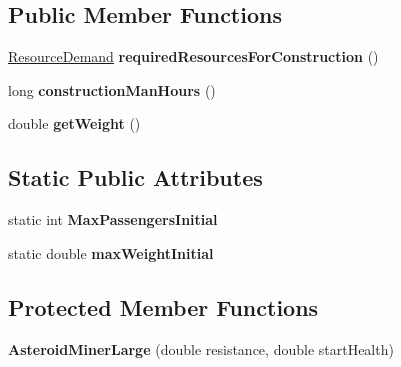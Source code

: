 \subsection*{Public Member Functions}
\begin{DoxyCompactItemize}
\item 
\hyperlink{classuniverse_1_1_resource_demand}{Resource\+Demand} {\bfseries required\+Resources\+For\+Construction} ()\hypertarget{classtools_1_1vehicles_1_1space_1_1_asteroid_miner_large_ac79889a6d0e5e5420521552a33ebceed}{}\label{classtools_1_1vehicles_1_1space_1_1_asteroid_miner_large_ac79889a6d0e5e5420521552a33ebceed}

\item 
long {\bfseries construction\+Man\+Hours} ()\hypertarget{classtools_1_1vehicles_1_1space_1_1_asteroid_miner_large_a690e76ff519675ed79d67c5017373c27}{}\label{classtools_1_1vehicles_1_1space_1_1_asteroid_miner_large_a690e76ff519675ed79d67c5017373c27}

\item 
double {\bfseries get\+Weight} ()\hypertarget{classtools_1_1vehicles_1_1space_1_1_asteroid_miner_large_a6eb93459c4c1efa825cb9dd372c1cfff}{}\label{classtools_1_1vehicles_1_1space_1_1_asteroid_miner_large_a6eb93459c4c1efa825cb9dd372c1cfff}

\end{DoxyCompactItemize}
\subsection*{Static Public Attributes}
\begin{DoxyCompactItemize}
\item 
static int {\bfseries Max\+Passengers\+Initial}\hypertarget{classtools_1_1vehicles_1_1space_1_1_asteroid_miner_large_af6c664faaaf1f18c707f0645fcc8c135}{}\label{classtools_1_1vehicles_1_1space_1_1_asteroid_miner_large_af6c664faaaf1f18c707f0645fcc8c135}

\item 
static double {\bfseries max\+Weight\+Initial}\hypertarget{classtools_1_1vehicles_1_1space_1_1_asteroid_miner_large_aae7c1c783024f8746c200d6abd9e86e3}{}\label{classtools_1_1vehicles_1_1space_1_1_asteroid_miner_large_aae7c1c783024f8746c200d6abd9e86e3}

\end{DoxyCompactItemize}
\subsection*{Protected Member Functions}
\begin{DoxyCompactItemize}
\item 
{\bfseries Asteroid\+Miner\+Large} (double resistance, double start\+Health)\hypertarget{classtools_1_1vehicles_1_1space_1_1_asteroid_miner_large_af1d41320c95165f9d78d8d9f441290f2}{}\label{classtools_1_1vehicles_1_1space_1_1_asteroid_miner_large_af1d41320c95165f9d78d8d9f441290f2}

\end{DoxyCompactItemize}

